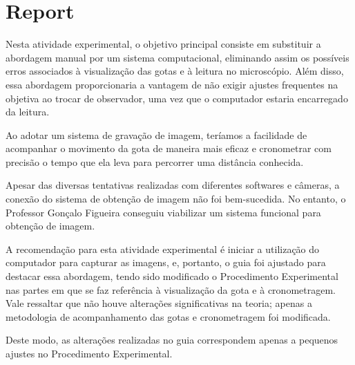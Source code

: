 \documentclass[12pt,a4paper,oneside]{paper}
\begin{document}
\pagestyle{plain}

%
% 



\def\title {Millikan}


%
% 

 
\cleardoublepage
{}\selectfont
\setcounter{page}{0}
%
%

\section{Report}
Nesta atividade experimental, o objetivo principal consiste em substituir a abordagem manual por um sistema computacional,
eliminando assim os possíveis erros associados à visualização das gotas e à leitura no microscópio. Além disso,
essa abordagem proporcionaria a vantagem de não exigir ajustes frequentes na objetiva ao trocar de observador,
uma vez que o computador estaria encarregado da leitura.

Ao adotar um sistema de gravação de imagem, teríamos a facilidade de acompanhar o movimento da gota de maneira mais eficaz
e cronometrar com precisão o tempo que ela leva para percorrer uma distância conhecida.

Apesar das diversas tentativas realizadas com diferentes softwares e câmeras, a conexão do sistema de obtenção de imagem
não foi bem-sucedida. No entanto, o Professor Gonçalo Figueira conseguiu viabilizar um sistema funcional para obtenção de imagem.

A recomendação para esta atividade experimental é iniciar a utilização do computador para capturar as imagens, e, portanto,
o guia foi ajustado para destacar essa abordagem, tendo sido modificado o Procedimento Experimental nas partes em que se
faz referência à visualização da gota e à cronometragem. Vale ressaltar que não houve alterações significativas na teoria;
apenas a metodologia de acompanhamento das gotas e cronometragem foi modificada.

Deste modo, as alterações realizadas no guia correspondem apenas a pequenos ajustes no Procedimento Experimental.


\clearpage



\appendix


\newpage
\end{document}
